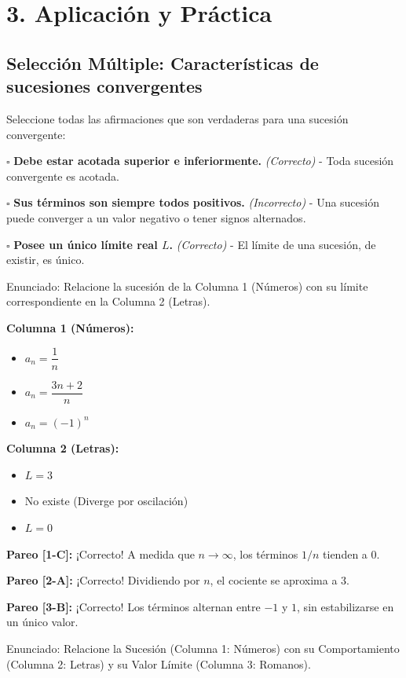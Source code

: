 \documentclass[11pt]{article}
\newenvironment{aplicacion}{%
  \section*{3. Aplicación y Práctica}%
}{}
\newenvironment{preguntacasillas}[1]{\subsection*{Selección Múltiple: #1}\par\vspace{0.1cm}}{\vspace{0.3cm}}
\newcommand{\casilla}[3]{\par\noindent $\square$ \textbf{#1} \textit{(#2)} - #3\par\vspace{0.15cm}}
\newenvironment{pareadosdoscolumnas}[1]{%
  \begin{tcolorbox}[colback=violet!5,colframe=violet!75!black,title=Términos Pareados (2 Columnas): #1]%
}{%
  \end{tcolorbox}%
}
\newenvironment{pareadostrescolumnas}[1]{%
  \begin{tcolorbox}[colback=teal!5,colframe=teal!75!black,title=Términos Pareados (3 Columnas): #1]%
}{%
  \end{tcolorbox}%
}
\newcommand{\columnaI}[1]{%
  \par\medskip
  \textbf{Columna 1 (Números):}\par
  \begin{itemize}
    #1
  \end{itemize}%
}
\newcommand{\columnaII}[1]{%
  \par\medskip
  \textbf{Columna 2 (Letras):}\par
  \begin{itemize}
    #1
  \end{itemize}%
}
\newcommand{\pareo}[2]{%
  \par\smallskip
  \textbf{Pareo [#1]:} #2\par
}
\begin{document}
\begin{aplicacion}
  \begin{preguntacasillas}{Características de sucesiones convergentes}
    Seleccione todas las afirmaciones que son verdaderas para una sucesión convergente:
    
    \casilla{Debe estar acotada superior e inferiormente.}{Correcto}{Toda sucesión convergente es acotada.}
    \casilla{Sus términos son siempre todos positivos.}{Incorrecto}{Una sucesión puede converger a un valor negativo o tener signos alternados.}
    \casilla{Posee un único límite real $L$.}{Correcto}{El límite de una sucesión, de existir, es único.}
  \end{preguntacasillas}

  \begin{pareadosdoscolumnas}{Asociación de Sucesiones con su Límite}
    Enunciado: Relacione la sucesión de la Columna 1 (Números) con su límite correspondiente en la Columna 2 (Letras).
    
    \columnaI{
      \item[1.] $a_n = \dfrac{1}{n}$
      \item[2.] $a_n = \dfrac{3n+2}{n}$
      \item[3.] $a_n = (-1)^n$
    }
    \columnaII{
      \item[A.] $L = 3$
      \item[B.] No existe (Diverge por oscilación)
      \item[C.] $L = 0$
    }
    
    \pareo{1-C}{¡Correcto! A medida que $n \to \infty$, los términos $1/n$ tienden a 0.}
    \pareo{2-A}{¡Correcto! Dividiendo por $n$, el cociente se aproxima a $3$.}
    \pareo{3-B}{¡Correcto! Los términos alternan entre $-1$ y $1$, sin estabilizarse en un único valor.}
  \end{pareadosdoscolumnas}

  \begin{pareadostrescolumnas}{Clasificación Completa de Sucesiones}
    Enunciado: Relacione la Sucesión (Columna 1: Números) con su Comportamiento (Columna 2: Letras) y su Valor Límite (Columna 3: Romanos).
    

\end{pareadostrescolumnas}
\end{aplicacion}
\end{document}
